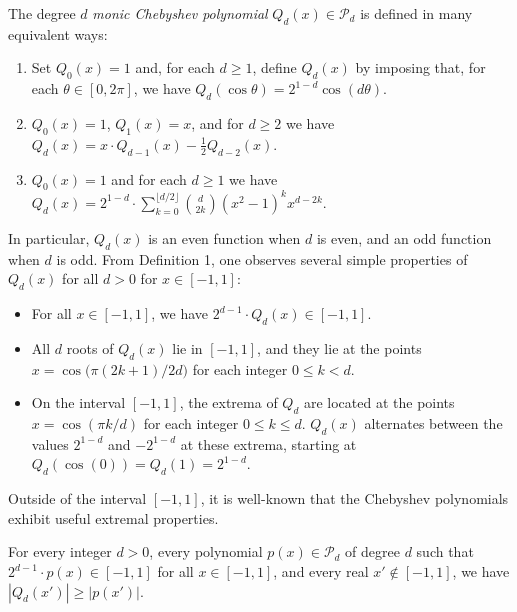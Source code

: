 The degree $d$ \emph{monic Chebyshev polynomial} $Q_d (x) \in \mathcal{P}_d$ is defined in many equivalent ways:
\begin{enumerate}[{Definition} 1]
    \item Set $Q_0 (x) = 1$ and, for each $d \ge 1$, define $Q_d (x)$ by imposing that, for each $\theta \in [0, 2 \pi]$, we have $Q_d (\cos \theta) = 2^{1 - d} \cos (d \theta)$. 
    \item $Q_0(x) = 1$, $Q_1(x) = x$, and for $d \geq 2$ we have $Q_d(x) = x \cdot Q_{d-1}(x) - \frac12 Q_{d-2}(x)$.
    \item $Q_0 (x) = 1$ and for each $d \ge 1$ we have $Q_d(x) = 2^{1-d} \cdot \sum_{k=0}^{\lfloor d/2 \rfloor} \binom{d}{2k} (x^2-1)^k x^{d-2k}$.
\end{enumerate}

In particular, $Q_d(x)$ is an even function when $d$ is even, and an odd function when $d$ is odd. From Definition 1, one observes several simple properties of $Q_d(x)$ for all $d>0$ for $x \in [-1,1]$:
\begin{itemize}
    \item For all $x \in [-1,1]$, we have $2^{d-1} \cdot Q_d(x) \in [-1,1]$.
    \item All $d$ roots of $Q_d(x)$ lie in $[-1,1]$, and they lie at the points $x = \cos \big( \pi (2k+1)/2d  \big)$ for each integer $0 \leq k < d$.
    \item On the interval $[-1,1]$, the extrema of $Q_d$ are located at the points $x = \cos\left( \pi k / d \right)$ for each integer $0 \leq k \leq d$. $Q_d(x)$ alternates between the values $2^{1-d}$ and $-2^{1-d}$ at these extrema, starting at $Q_d(\cos(0)) = Q_d(1) = 2^{1-d}$.
\end{itemize}  

Outside of the interval $[-1,1]$, it is well-known that the Chebyshev polynomials exhibit useful extremal properties.

\begin{fact} \label{extremalcheby}
For every integer $d>0$, every polynomial $p(x) \in \mathcal{P}_d$ of degree $d$ such that $2^{d-1} \cdot p(x) \in [-1,1]$ for all $x \in [-1,1]$, and every real $x' \notin [-1,1]$, we have $|Q_d(x')| \geq |p(x')|$.
\end{fact}

